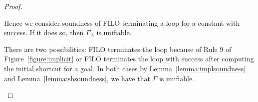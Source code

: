 \documentclass{article}
\begin{document}
\begin{proof}
\begin{enumerate}
		Hence we consider soundness of FILO terminating a loop for a constant with success. If it does so, then $\Gamma_A$ is unifiable.
		
		There are two possibilities: FILO terminates the loop because of Rule 9 of Figure~\ref{figure:implicit} or 	
		 FILO terminates the loop with success after computing the initial shortcut for a goal. 
		In both cases by   Lemma~\ref{lemma:implsoundness} and Lemma~\ref{lemma:shsoundness}, we have that $\Gamma$ is unifiable.
	
		
		\end{enumerate} 
%			
		\end{proof}
		
\end{document}
